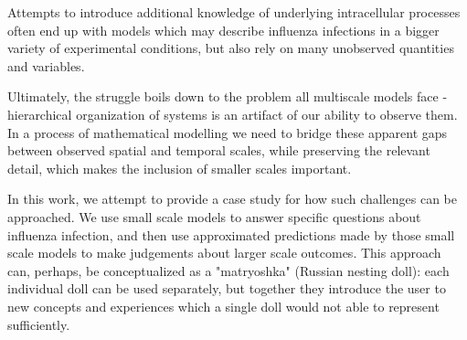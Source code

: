 Attempts to introduce additional knowledge of underlying intracellular processes \cite{heldt2013multiscale, rudiger2019multiscale} often end up with models which may describe influenza infections in a bigger variety of experimental conditions, but also rely on many unobserved quantities and variables.

Ultimately, the struggle boils down to the problem all multiscale models face \cite{qu2011multi} - hierarchical organization of systems is an artifact of our ability to observe them. In a process of mathematical modelling we need to bridge these apparent gaps between observed spatial and temporal scales, while preserving the relevant detail, which makes the inclusion of smaller scales important.

In this work, we attempt to provide a case study for how such challenges can be approached. We use small scale models to answer specific questions about influenza infection, and then use approximated predictions made by those small scale models to make judgements about larger scale outcomes. This approach can, perhaps, be conceptualized as a "matryoshka" (Russian nesting doll): each individual doll can be used separately, but together they introduce the user to new concepts and experiences which a single doll would not able to represent sufficiently.

















%